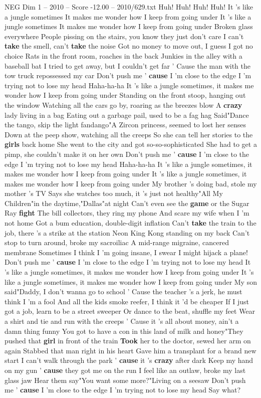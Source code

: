 \begin{textsample}{NEG Dim 1 – 2010 – Score -12.00 – 2010/629.txt}  \label{ex:f1_neg_021}
Huh!
Huh!
Huh!
Huh!
It 's like a jungle sometimes It makes me wonder how I keep from going under It 's like a jungle sometimes It makes me wonder how I keep from going under Broken glass everywhere People pissing on the stairs, you know they just don't care I can't \textbf{take} the smell, can't \textbf{take} the noise Got no money to move out, I guess I got no choice Rats in the front room, roaches in the back Junkies in the alley with a baseball bat I tried to get away, but I couldn't get far ' Cause the man with the tow truck repossessed my car Don't push me ' \textbf{cause} I 'm close to the edge I 'm trying not to lose my head Haha-ha-ha It 's like a jungle sometimes, it makes me wonder how I keep from going under Standing on the front stoop, hanging out the window Watching all the cars go by, roaring as the breezes blow A \textbf{crazy} lady living in a bag Eating out a garbage pail, used to be a fag hag Said"Dance the tango, skip the light fandango"A Zircon princess, seemed to lost her senses Down at the peep show, watching all the creeps So she can tell her stories to the \textbf{girls} back home She went to the city and got so-so-sophisticated She had to get a pimp, she couldn't make it on her own Don't push me ' \textbf{cause} I 'm close to the edge I 'm trying not to lose my head Haha-ha-ha It 's like a jungle sometimes, it makes me wonder how I keep from going under It 's like a jungle sometimes, it makes me wonder how I keep from going under My brother 's doing bad, stole my mother 's TV Says she watches too much, it 's just not healthy"All My Children"in the daytime,"Dallas"at night Can't even see the \textbf{game} or the Sugar Ray \textbf{fight} The bill collectors, they ring my phone And scare my wife when I 'm not home Got a bum education, double-digit inflation Can't \textbf{take} the train to the job, there 's a strike at the station Neon King Kong standing on my back Can't stop to turn around, broke my sacroiliac A mid-range migraine, cancered membrane Sometimes I think I 'm going insane, I swear I might hijack a plane!
Don't push me ' \textbf{cause} I 'm close to the edge I 'm trying not to lose my head It 's like a jungle sometimes, it makes me wonder how I keep from going under It 's like a jungle sometimes, it makes me wonder how I keep from going under My son said"Daddy, I don't wanna go to school ' Cause the teacher 's a jerk, he must think I 'm a fool And all the kids smoke reefer, I think it 'd be cheaper If I just got a job, learn to be a street sweeper Or dance to the beat, shuffle my feet Wear a shirt and tie and run with the creeps ' Cause it 's all about money, ain't a damn thing funny You got to have a con in this land of milk and honey"They pushed that \textbf{girl} in front of the train \textbf{Took} her to the doctor, sewed her arm on again Stabbed that man right in his heart Gave him a transplant for a brand new start I can't walk through the park ' \textbf{cause} it 's \textbf{crazy} after dark Keep my hand on my gun ' \textbf{cause} they got me on the run I feel like an outlaw, broke my last glass jaw Hear them say"You want some more?"Living on a seesaw Don't push me ' \textbf{cause} I 'm close to the edge I 'm trying not to lose my head Say what?

\end{textsample}
